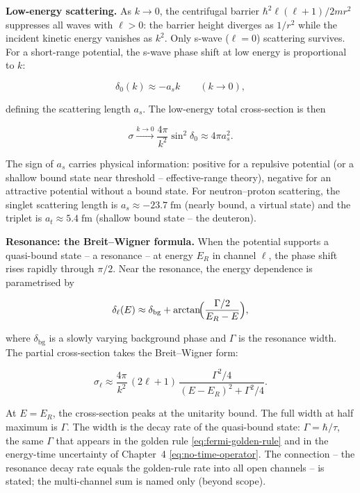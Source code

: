 \medskip\noindent\textbf{Low-energy scattering.}
As $k \to 0$, the centrifugal barrier $\hbar^{2}\ell(\ell+1)/2mr^{2}$ suppresses all waves with $\ell > 0$: the barrier height diverges as $1/r^{2}$ while the incident kinetic energy vanishes as $k^{2}$. Only s-wave ($\ell=0$) scattering survives. For a short-range potential, the s-wave phase shift at low energy is proportional to $k$:
\begin{linenomath}
\begin{equation}
\delta_{0}(k) \approx -a_{s}k \qquad (k \to 0),
\label{eq:scattering-length}
\end{equation}
\end{linenomath}
defining the scattering length $a_{s}$. The low-energy total cross-section is then
\begin{linenomath}
\begin{equation*}
\sigma \xrightarrow{k\to 0} \frac{4\pi}{k^{2}}\sin^{2}\delta_{0} \approx 4\pi a_{s}^{2}.
\end{equation*}
\end{linenomath}
The sign of $a_{s}$ carries physical information: positive for a repulsive potential (or a shallow bound state near threshold -- effective-range theory), negative for an attractive potential without a bound state. For neutron--proton scattering, the singlet scattering length is $a_{s} \approx -23.7\;\text{fm}$ (nearly bound, a virtual state) and the triplet is $a_{t} \approx 5.4\;\text{fm}$ (shallow bound state -- the deuteron).

\medskip\noindent\textbf{Resonance: the Breit--Wigner formula.}
When the potential supports a quasi-bound state -- a resonance -- at energy $E_{R}$ in channel $\ell$, the phase shift rises rapidly through $\pi/2$. Near the resonance, the energy dependence is parametrised by
\begin{linenomath}
\begin{equation*}
\delta_{\ell}(E) \approx \delta_{\text{bg}} + \arctan\!\Bigl(\frac{\Gamma/2}{E_{R}-E}\Bigr),
\end{equation*}
\end{linenomath}
where $\delta_{\text{bg}}$ is a slowly varying background phase and $\Gamma$ is the resonance width. The partial cross-section takes the Breit--Wigner form:
\begin{linenomath}
\begin{equation}
\sigma_{\ell} \approx \frac{4\pi}{k^{2}}\,(2\ell+1)\,
\frac{\Gamma^{2}/4}{(E-E_{R})^{2} + \Gamma^{2}/4}.
\label{eq:breit-wigner}
\end{equation}
\end{linenomath}
At $E = E_{R}$, the cross-section peaks at the unitarity bound. The full width at half maximum is $\Gamma$. The width is the decay rate of the quasi-bound state: $\Gamma = \hbar/\tau$, the same $\Gamma$ that appears in the golden rule \eqref{eq:fermi-golden-rule} and in the energy-time uncertainty of Chapter~4 \eqref{eq:no-time-operator}. The connection -- the resonance decay rate equals the golden-rule rate into all open channels -- is stated; the multi-channel sum is named only (beyond scope).

